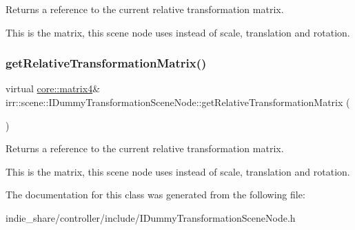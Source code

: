 Returns a reference to the current relative transformation matrix. 

This is the matrix, this scene node uses instead of scale, translation and rotation. \mbox{\label{classirr_1_1scene_1_1IDummyTransformationSceneNode_a95612d8bb225213c907fbf5a2606f0d3}} 
\subsubsection{\texorpdfstring{get\+Relative\+Transformation\+Matrix()}{getRelativeTransformationMatrix()}\hspace{0.1cm}{\footnotesize\ttfamily [2/2]}}
{\footnotesize\ttfamily virtual \hyperlink{namespaceirr_1_1core_a4c9d4e29899535971052810954a14431}{core\+::matrix4}\& irr\+::scene\+::\+I\+Dummy\+Transformation\+Scene\+Node\+::get\+Relative\+Transformation\+Matrix (\begin{DoxyParamCaption}{ }\end{DoxyParamCaption})\hspace{0.3cm}{\ttfamily [pure virtual]}}



Returns a reference to the current relative transformation matrix. 

This is the matrix, this scene node uses instead of scale, translation and rotation. 

The documentation for this class was generated from the following file\+:\begin{DoxyCompactItemize}
\item 
indie\+\_\+share/controller/include/I\+Dummy\+Transformation\+Scene\+Node.\+h\end{DoxyCompactItemize}
